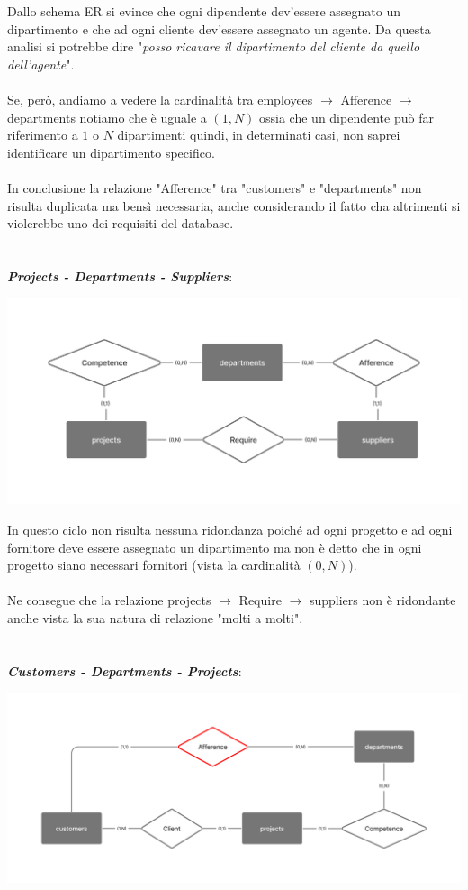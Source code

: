 \documentclass[12pt,a4paper]{article}
\begin{document}
Dallo schema ER si evince che ogni dipendente dev'essere assegnato un dipartimento e che ad ogni cliente dev'essere assegnato un agente. Da questa analisi si potrebbe dire "\textit{posso ricavare il dipartimento del cliente da quello dell'agente}".\\
\\
Se, però, andiamo a vedere la cardinalità tra employees $\rightarrow$ Afference $\rightarrow$ departments notiamo che è uguale a $(1,N)$ ossia che un dipendente può far riferimento a $1$ o $N$ dipartimenti quindi, in determinati casi, non saprei identificare un dipartimento specifico.\\
\\
In conclusione la relazione "Afference" tra "customers" e "departments" non risulta duplicata ma bensì necessaria, anche considerando il fatto cha altrimenti si violerebbe uno dei requisiti del database.\\
\\
\\
\textbf{\textit{Projects - Departments - Suppliers}}:
\begin{center}
\includegraphics[width=0.6\columnwidth]{../../img/er_cycle_projects-departments-suppliers}
\end{center}
In questo ciclo non risulta nessuna ridondanza poiché ad ogni progetto e ad ogni fornitore deve essere assegnato un dipartimento ma non è detto che in ogni progetto siano necessari fornitori (vista la cardinalità $(0,N)$).\\
\\
Ne consegue che la relazione projects $\rightarrow$ Require $\rightarrow$ suppliers non è ridondante anche vista la sua natura di relazione "molti a molti".\\
\\
\\
\textbf{\textit{Customers - Departments - Projects}}:
\begin{center}
\includegraphics[width=0.6\columnwidth]{../../img/er_cycle_customers-departments-projects}
\end{center}
\end{document}
